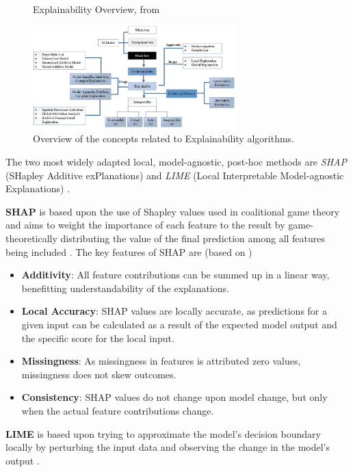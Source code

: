 \begin{figure}[h]
    \centering
    \caption{Explainability Overview, from \cite{SALEEM2022165}}
    \includegraphics[width=0.7\textwidth]{images/CH02_algorithms_overview_Saleem.jpg}
    \caption*{Overview of the concepts related to Explainability algorithms.}
    \label{fig:explainability_overview}
\end{figure}

The two most widely adapted local, model-agnostic, post-hoc methods are \textit{SHAP} (SHapley Additive exPlanations) \parencite{Lundberg2017} and \textit{LIME} (Local Interpretable Model-agnostic Explanations) \parencite{Ribeiro2016}.

\textbf{SHAP} is based upon the use of Shapley values used in coalitional game theory and aims to weight the importance of each feature to the result by game-theoretically distributing the value of the final prediction among all features being included \parencite{Molnar2023}.
The key features of SHAP are (based on \cite{Molnar2023})
\begin{itemize}
    \item \textbf{Additivity}: All feature contributions can be summed up in a linear way, benefitting understandability of the explanations.
    \item \textbf{Local Accuracy}: SHAP values are locally accurate, as predictions for a given input can be calculated as a result of the expected model output and the specific score for the local input.
    \item \textbf{Missingness}: As missingness in features is attributed zero values, missingness does not skew outcomes.
    \item \textbf{Consistency}: SHAP values do not change upon model change, but only when the actual feature contributions change.
\end{itemize}

\textbf{LIME} is based upon trying to approximate the model's decision boundary locally by perturbing the input data and observing the change in the model's output \parencite{Molnar2023}.

